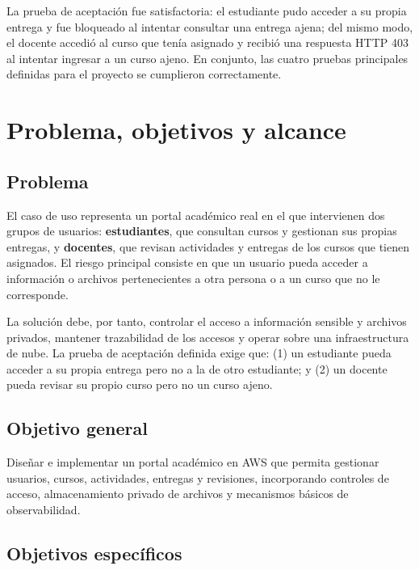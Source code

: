 \documentclass[11pt,letterpaper]{article}
\begin{document}
La prueba de aceptación fue satisfactoria: el estudiante pudo acceder a su propia entrega y fue bloqueado al intentar consultar una entrega ajena; del mismo modo, el docente accedió al curso que tenía asignado y recibió una respuesta HTTP 403 al intentar ingresar a un curso ajeno. En conjunto, las cuatro pruebas principales definidas para el proyecto se cumplieron correctamente.

\section{Problema, objetivos y alcance}

\subsection{Problema}

El caso de uso representa un portal académico real en el que intervienen dos grupos de usuarios: \textbf{estudiantes}, que consultan cursos y gestionan sus propias entregas, y \textbf{docentes}, que revisan actividades y entregas de los cursos que tienen asignados. El riesgo principal consiste en que un usuario pueda acceder a información o archivos pertenecientes a otra persona o a un curso que no le corresponde.

La solución debe, por tanto, controlar el acceso a información sensible y archivos privados, mantener trazabilidad de los accesos y operar sobre una infraestructura de nube. La prueba de aceptación definida exige que: (1) un estudiante pueda acceder a su propia entrega pero no a la de otro estudiante; y (2) un docente pueda revisar su propio curso pero no un curso ajeno.

\subsection{Objetivo general}

Diseñar e implementar un portal académico en AWS que permita gestionar usuarios, cursos, actividades, entregas y revisiones, incorporando controles de acceso, almacenamiento privado de archivos y mecanismos básicos de observabilidad.

\subsection{Objetivos específicos}
\end{document}
